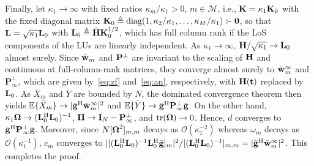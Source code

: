 \documentclass[journal]{IEEEtran}
\begin{document}
Finally, let $\kappa_1\to\infty$ with fixed ratios $\kappa_m/\kappa_1>0$, $m\in\mathcal M$, i.e., $\mathbf{K}=\kappa_1\mathbf{K}_0$ with the fixed diagonal matrix $\mathbf{K}_0\triangleq\mathrm{diag}(1,\kappa_2/\kappa_1,\ldots,\kappa_M/\kappa_1)\succ\mathbf 0$, so that $\mathbf{L}=\sqrt{\kappa_1}\mathbf{L}_0$ with $\mathbf{L}_0\triangleq\bar{\mathbf{H}}\mathbf{K}_0^{1/2}$, which has full column rank if the LoS components of the LUs are linearly independent. As $\kappa_1\to\infty$, $\mathbf{H}/\sqrt{\kappa_1}\to\mathbf{L}_0$ almost surely. Since $\bar{\mathbf{w}}_m$ and $\mathbf{P}^{\perp}$ are invariant to the scaling of $\mathbf{H}$ and continuous at full-column-rank matrices, they converge almost surely to $\bar{\mathbf{w}}_m^{\infty}$ and $\mathbf P_{\infty}^\perp$, which are given by~\eqref{eq:zf} and~\eqref{eq:an}, respectively, with $\mathbf{H}(\mathbf{t})$ replaced by $\mathbf{L}_0$. As $\bar X_m$ and $\bar Y$ are bounded by $N$, the dominated convergence theorem then yields $\mathbb{E}\{\bar X_m\}\to|\bar{\mathbf{g}}^{\mathrm H}\bar{\mathbf{w}}_m^{\infty}|^2$ and $\mathbb{E}\{\bar Y\}\to\bar{\mathbf{g}}^{\mathrm H}\mathbf P_{\infty}^\perp\bar{\mathbf{g}}$. On the other hand, $\kappa_1\boldsymbol{\Omega}\to(\mathbf{L}_0^{\mathrm H}\mathbf{L}_0)^{-1}$, $\boldsymbol{\Pi}\to\mathbf{I}_N-\mathbf P_{\infty}^\perp$, and $\mathrm{tr}(\boldsymbol{\Omega})\to0$. Hence, $d$ converges to $\bar{\mathbf{g}}^{\mathrm H}\mathbf P_{\infty}^\perp\bar{\mathbf{g}}$. Moreover, since $N[\boldsymbol{\Omega}^2]_{m,m}$ decays as $\mathcal O(\kappa_1^{-2})$ whereas $\omega_m$ decays as $\mathcal O(\kappa_1^{-1})$, $c_m$ converges to $|[(\mathbf{L}_0^{\mathrm H}\mathbf{L}_0)^{-1}\mathbf{L}_0^{\mathrm H}\bar{\mathbf{g}}]_m|^2/[(\mathbf{L}_0^{\mathrm H}\mathbf{L}_0)^{-1}]_{m,m}=|\bar{\mathbf{g}}^{\mathrm H}\bar{\mathbf{w}}_m^{\infty}|^2$. This completes the proof.

\end{document}
